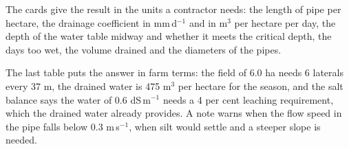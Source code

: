 
The cards give the result in the units a contractor needs: the length of pipe per hectare, the drainage coefficient in mm\,d$^{-1}$ and in m$^3$ per hectare per day, the depth of the water table midway and whether it meets the critical depth, the days too wet, the volume drained and the diameters of the pipes.


The last table puts the answer in farm terms: the field of 6.0 ha needs 6 laterals every 37 m, the drained water is 475 m$^3$ per hectare for the season, and the salt balance says the water of 0.6 dS\,m$^{-1}$ needs a 4 per cent leaching requirement, which the drained water already provides. A note warns when the flow speed in the pipe falls below 0.3 m\,s$^{-1}$, when silt would settle and a steeper slope is needed.


